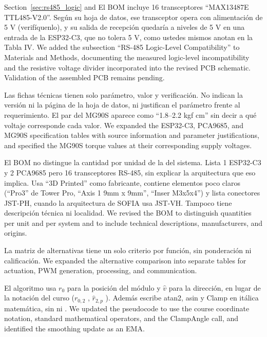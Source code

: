 \documentclass{LabDSTresponse}
\begin{document}
	{Section~\ref{sec:rs485_logic} and }
	{El BOM incluye 16 transceptores “MAX13487E TTL485-V2.0”. Según su hoja de datos, ese transceptor opera con alimentación de 5 V (verifíquenlo), y su salida de recepción quedaría a niveles de 5 V en una entrada de la ESP32-C3, que no tolera 5 V, como ustedes mismos anotan en la Tabla IV.}
	{We added the subsection ``RS-485 Logic-Level Compatibility'' to Materials and Methods, documenting the measured logic-level incompatibility and the resistive voltage divider incorporated into the revised PCB schematic. Validation of the assembled PCB remains pending.}
	
	{Las fichas técnicas tienen solo parámetro, valor y verificación. No indican la versión ni la página de la hoja de datos, ni justifican el parámetro frente al requerimiento. El par del MG90S aparece como “1.8–2.2 kgf cm” sin decir a qué voltaje corresponde cada valor.}
	{We expanded the ESP32-C3, PCA9685, and MG90S specification tables with source information and parameter justifications, and specified the MG90S torque values at their corresponding supply voltages.}
	
	{El BOM no distingue la cantidad por unidad de la del sistema. Lista 1 ESP32-C3 y 2 PCA9685 pero 16 transceptores RS-485, sin explicar la arquitectura que eso implica. Usa “3D Printed” como fabricante, contiene elementos poco claros (“Pro3” de Tower Pro, “Axis 1 9mm x 9mm”, “Inser M3x5x4”) y lista conectores JST-PH, cuando la arquitectura de SOFIA usa JST-VH. Tampoco tiene descripción técnica ni localidad.}
	{We revised the BOM to distinguish quantities per unit and per system and to include technical descriptions, manufacturers, and origins.}
	
	{La matriz de alternativas tiene un solo criterio por función, sin ponderación ni calificación.}
	{We expanded the alternative comparison into separate tables for actuation, PWM generation, processing, and communication.}
	
	{El algoritmo usa $r_0$ para la posición del módulo y $\hat{v}$ para la dirección, en lugar de la notación del curso ($r_{0,2}$ , $\hat{r}_{2,p}$ ). Además escribe atan2, asin y Clamp en itálica matemática, sin \texttt{\string\operatorname} ni \texttt{\string\Call}.}
	{We updated the pseudocode to use the course coordinate notation, standard mathematical operators, and the ClampAngle call, and identified the smoothing update as an EMA.}
	
\end{document}

